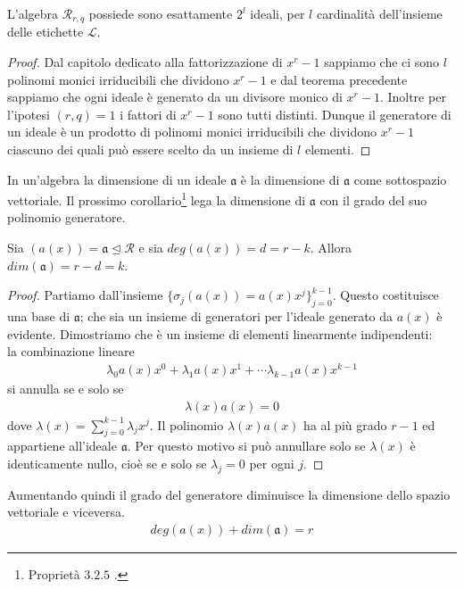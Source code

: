 \begin{corollario} \label{coroll:cardIdealiDiR}
   L'algebra $\mathcal{R}_{r,q}$ possiede sono esattamente $2^{l}$ ideali, per $l$ cardinalità dell'insieme delle etichette $\mathscr{L}$.
\end{corollario}
\begin{proof}
   Dal capitolo dedicato alla fattorizzazione di $x^r-1$ sappiamo che ci sono $l$ polinomi monici irriducibili che dividono $x^r-1$ e dal teorema precedente sappiamo che ogni ideale è generato da un divisore monico di $x^r - 1$.
   Inoltre per l'ipotesi $(r,q) = 1$ i fattori di $x^r-1$ sono tutti distinti.
   Dunque il generatore di un ideale è un prodotto di polinomi monici irriducibili che dividono $x^r-1$ ciascuno dei quali può essere scelto da un insieme di $l$ elementi.
\end{proof}

In un'algebra la dimensione di un ideale $\mathfrak{a}$ è la dimensione di $\mathfrak{a}$ come sottospazio vettoriale.
Il prossimo corollario\footnote{Proprietà $3.2.5$ \cite{montabone}.} lega la dimensione di $\mathfrak{a}$ con il grado del suo polinomio generatore.
\begin{corollario} \label{cor:baseDellIdeale}
   Sia $(a(x)) = \mathfrak{a} \unlhd \mathcal{R}$ e sia $deg(a(x)) = d = r-k$. Allora $dim(\mathfrak{a}) = r-d = k $.
\end{corollario}
\begin{proof}
   Partiamo dall'insieme $\lbrace \sigma_{j}(a(x)) = a(x)x^{j} \rbrace_{j=0}^{k-1}$. Questo costituisce una base di $\mathfrak{a}$; che sia un insieme di generatori per l'ideale generato da $a(x)$ è evidente. Dimostriamo che è un insieme di elementi linearmente indipendenti: \\
   la combinazione lineare
   \begin{align*}
      \lambda_{0} a(x)x^{0} + \lambda_{1} a(x)x^{1}+ \cdots \lambda_{k-1} a(x)x^{k-1}
   \end{align*}
   si annulla se e solo se
   \begin{align*}
      \lambda(x)a(x) = 0
   \end{align*}
   dove $\lambda(x) = \sum_{j=0}^{k-1}\lambda_{j}x^{j}$. Il polinomio $\lambda(x)a(x)$ ha al più grado $r-1$ ed appartiene all'ideale $\mathfrak{a}$. Per questo motivo si può annullare solo se $\lambda(x)$ è identicamente nullo, cioè se e solo se $\lambda_{j} = 0 $ per ogni $j$.
\end{proof}
\noindent
Aumentando quindi il grado del generatore diminuisce la dimensione dello spazio vettoriale e viceversa.
\begin{align*}
   deg(a(x)) + dim(\mathfrak{a}) = r
\end{align*}

